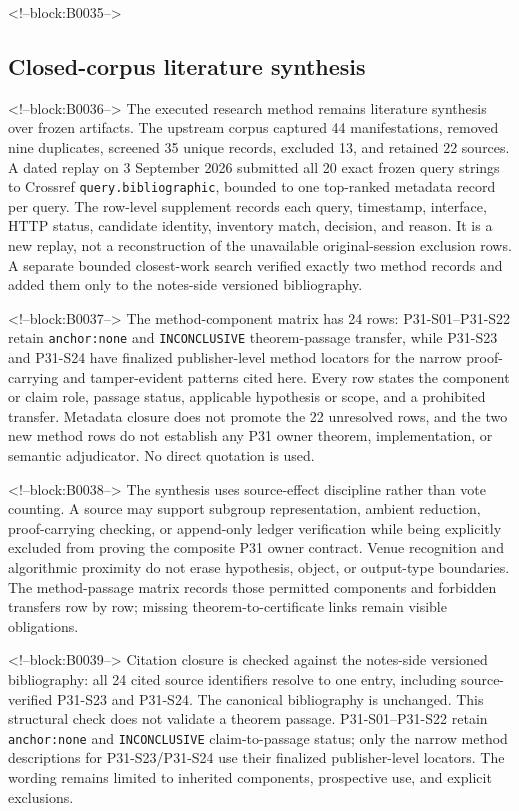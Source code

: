 \documentclass[11pt]{article}
\begin{document}
<!--block:B0035-->
\hypertarget{31-closed-corpus-literature-synthesis}{%
\subsection{Closed-corpus literature
synthesis}\label{31-closed-corpus-literature-synthesis}}

<!--block:B0036-->
The executed research method remains literature synthesis over frozen artifacts.
The upstream corpus captured 44 manifestations, removed nine duplicates, screened
35 unique records, excluded 13, and retained 22 sources.  A dated replay on
3 September 2026 submitted all 20 exact frozen query strings to Crossref
\texttt{query.bibliographic}, bounded to one top-ranked metadata record per query.
The row-level supplement records each query, timestamp, interface, HTTP status,
candidate identity, inventory match, decision, and reason.  It is a new replay,
not a reconstruction of the unavailable original-session exclusion rows.  A
separate bounded closest-work search verified exactly two method records and
added them only to the notes-side versioned bibliography.

<!--block:B0037-->
The method-component matrix has 24 rows: P31-S01--P31-S22 retain
\texttt{anchor:none} and \texttt{INCONCLUSIVE} theorem-passage transfer, while
P31-S23 and P31-S24 have finalized publisher-level method locators for the narrow
proof-carrying and tamper-evident patterns cited here.  Every row states the
component or claim role, passage status, applicable hypothesis or scope, and a
prohibited transfer.  Metadata closure does not promote the 22 unresolved rows,
and the two new method rows do not establish any P31 owner theorem, implementation,
or semantic adjudicator.  No direct quotation is used.

<!--block:B0038-->
The synthesis uses source-effect discipline rather than vote counting.  A source
may support subgroup representation, ambient reduction, proof-carrying checking,
or append-only ledger verification while being explicitly excluded from proving
the composite P31 owner contract.  Venue recognition and algorithmic proximity do
not erase hypothesis, object, or output-type boundaries.  The method-passage
matrix records those permitted components and forbidden transfers row by row;
missing theorem-to-certificate links remain visible obligations.

<!--block:B0039-->
Citation closure is checked against the notes-side versioned bibliography: all
24 cited source identifiers resolve to one entry, including source-verified
P31-S23 and P31-S24.  The canonical bibliography is unchanged.  This structural
check does not validate a theorem passage.  P31-S01--P31-S22 retain
\texttt{anchor:none} and \texttt{INCONCLUSIVE} claim-to-passage status; only the
narrow method descriptions for P31-S23/P31-S24 use their finalized publisher-level
locators.  The wording remains limited to inherited components, prospective use,
and explicit exclusions.
\end{document}
